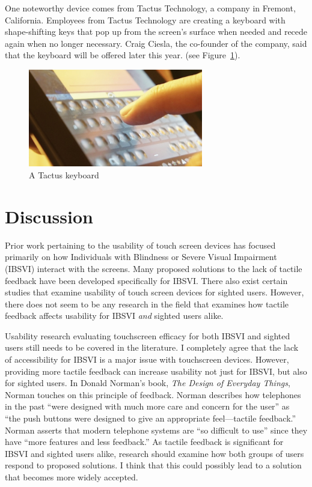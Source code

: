 \documentclass[11pt]{article}
\begin{document}
One noteworthy device comes from Tactus Technology, a company in Fremont, California. Employees from Tactus Technology are creating a keyboard with shape-shifting keys that pop up from the screen's surface when needed and recede again when no longer necessary.\cite{Tactus} Craig Ciesla, the co-founder of the company, said that the keyboard will be offered later this year. (see Figure~\ref{tactus-keyboard}).

\begin{figure}[ht]
\centering
\includegraphics[width=3in]{tactus-keyboard.jpg} 
\caption{A Tactus keyboard}
\label{tactus-keyboard}
\end{figure}


\section{Discussion}
Prior work pertaining to the usability of touch screen devices has focused primarily on how Individuals with Blindness or Severe Visual Impairment (IBSVI) interact with the screens. Many proposed solutions to the lack of tactile feedback have been developed specifically for IBSVI. There also exist certain studies that examine usability of touch screen devices for sighted users. \cite{Tinwala:2010:ETE:1868914.1868972} However, there does not seem to be any research in the field that examines how tactile feedback affects usability for IBSVI \textit{and} sighted users alike.

Usability research evaluating touchscreen efficacy for both IBSVI and sighted users still needs to be covered in the literature. I completely agree that the lack of accessibility for IBSVI is a major issue with touchscreen devices. However, providing more tactile feedback can increase usability not just for IBSVI, but also for sighted users. In Donald Norman's book, \textit{The Design of Everyday Things}, Norman touches on this principle of feedback. Norman describes how telephones in the past ``were designed with much more care and concern for the user'' as ``the push buttons were designed to give an appropriate feel---tactile feedback.''\cite{Norman02} Norman asserts that modern telephone systems are ``so difficult to use'' since they have ``more features and less feedback.''\cite{Norman02} As tactile feedback is significant for IBSVI and sighted users alike, research should examine how both groups of users respond to proposed solutions. I think that this could possibly lead to a solution that becomes more widely accepted.
\end{document}
